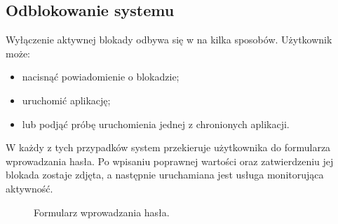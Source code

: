 \subsection{Odblokowanie systemu}
Wyłączenie aktywnej blokady odbywa się w na kilka sposobów. Użytkownik może:
\begin{itemize}
    \item nacisnąć powiadomienie o blokadzie;
    \item uruchomić aplikację;
    \item lub podjąć próbę uruchomienia jednej z chronionych aplikacji.
\end{itemize}

W każdy z tych przypadków system przekieruje użytkownika do formularza wprowadzania hasła. Po wpisaniu poprawnej wartości oraz zatwierdzeniu jej blokada zostaje zdjęta, a następnie uruchamiana jest usługa monitorująca aktywność.
\newline\newline\newline
\begin{figure}[H]
    \begin{center}
        \setlength{\fboxsep}{0pt}%
        \setlength{\fboxrule}{0.3pt}%
    \end{center}
    \caption{{\color{dgray}Formularz wprowadzania hasła.}} \label{enterPassword}
\end{figure}
